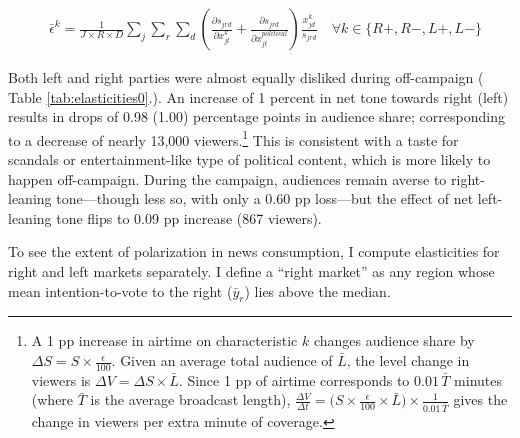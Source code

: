 \documentclass[12pt]{article}
\begin{document}
	
	
	
	\begin{equation}\label{eq:elasticities}
		\begin{aligned}
			& \bar{\epsilon}^k= \frac{1}{J\times R \times D}\sum_{j}\sum_{r} \sum_{d} \left(\frac{\partial s_{jrd}}{\partial x_{jt}^k} +  \frac{\partial s_{jrd}}{\partial x_{jt}^{political}} \right) \frac{x_{jd}^k}{s_{jrd}}    \quad \forall k \in \{R+,R-,L+,L-\}
		\end{aligned}
	\end{equation}             
	
	
	
	Both left and right parties were almost equally disliked during off-campaign ( Table \ref{tab:elasticities0}.). An increase of 1 percent in net tone  towards right (left) results in drops of 0.98 (1.00) percentage points in audience share; corresponding to a decrease of nearly 13,000 viewers.\footnote{A 1 pp increase in airtime on characteristic $k$ changes audience share by $\Delta S = S \times \tfrac{\epsilon}{100}$. Given an average total audience of $\bar{L}$, the level change in viewers is $\Delta V = \Delta S \times \bar{L}$. Since 1 pp of airtime corresponds to $0.01\,\bar{T}$ minutes (where $\bar{T}$ is the average broadcast length), $\tfrac{\Delta V}{\Delta t} = \bigl(S \times \tfrac{\epsilon}{100} \times \bar{L}\bigr) \times \tfrac{1}{0.01\,\bar{T}}$ gives the change in viewers per extra minute of coverage.} This is consistent with a taste for scandals or entertainment-like type of political content, which is more likely to happen off-campaign. During the campaign, audiences remain averse to right-leaning tone—though less so, with only a 0.60 pp loss—but the effect of net left-leaning tone flips to 0.09 pp increase (867 viewers).
	
	
	To see the extent of polarization in news consumption, I  compute elasticities for right and left markets separately. I define a “right market” as any region whose mean intention-to-vote to the right  ($\bar{y}_r$) lies above the median. 
	
\end{document}
